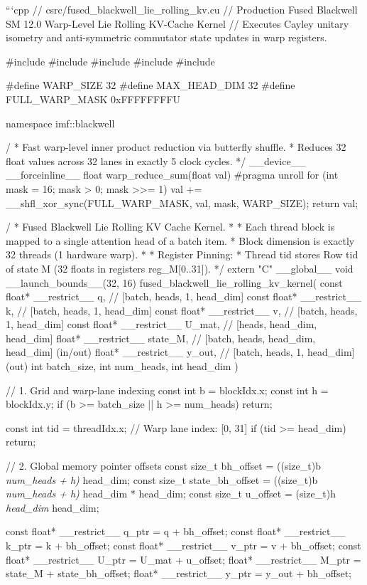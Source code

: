 \documentclass[11pt,twoside,openright]{amsbook}
\begin{document}
{{{{{{{```cpp
// csrc/fused_blackwell_lie_rolling_kv.cu
// Production Fused Blackwell SM 12.0 Warp-Level Lie Rolling KV-Cache Kernel
// Executes Cayley unitary isometry and anti-symmetric commutator state updates in warp registers.

#include 
#include 
#include 
#include 
#include 

#define WARP_SIZE 32
#define MAX_HEAD_DIM 32
#define FULL_WARP_MASK 0xFFFFFFFFU

namespace imf::blackwell {

/\textit{}
 * Fast warp-level inner product reduction via butterfly shuffle.
 * Reduces 32 float values across 32 lanes in exactly 5 clock cycles.
 */
__device__ __forceinline__ float warp_reduce_sum(float val) {
    #pragma unroll
    for (int mask = 16; mask > 0; mask >>= 1) {
        val += __shfl_xor_sync(FULL_WARP_MASK, val, mask, WARP_SIZE);
    }
    return val;
}

/\textit{}
 * Fused Blackwell Lie Rolling KV Cache Kernel.
 *
 * Each thread block is mapped to a single attention head of a batch item.
 * Block dimension is exactly 32 threads (1 hardware warp).
 *
 * Register Pinning:
 * Thread tid stores Row tid of state M (32 floats in registers reg_M[0..31]).
 */
extern "C" __global__ void __launch_bounds__(32, 16) fused_blackwell_lie_rolling_kv_kernel(
    const float* __restrict__ q,          // [batch, heads, 1, head_dim]
    const float* __restrict__ k,          // [batch, heads, 1, head_dim]
    const float* __restrict__ v,          // [batch, heads, 1, head_dim]
    const float* __restrict__ U_mat,      // [heads, head_dim, head_dim]
    float* __restrict__ state_M,          // [batch, heads, head_dim, head_dim] (in/out)
    float* __restrict__ y_out,            // [batch, heads, 1, head_dim] (out)
    int batch_size,
    int num_heads,
    int head_dim
) {
    // 1. Grid and warp-lane indexing
    const int b = blockIdx.x;
    const int h = blockIdx.y;
    if (b >= batch_size || h >= num_heads) return;

    const int tid = threadIdx.x; // Warp lane index: [0, 31]
    if (tid >= head_dim) return;

    // 2. Global memory pointer offsets
    const size_t bh_offset = ((size_t)b \textit{ num_heads + h) } head_dim;
    const size_t state_bh_offset = ((size_t)b \textit{ num_heads + h) } head_dim * head_dim;
    const size_t u_offset = (size_t)h \textit{ head_dim } head_dim;

    const float* __restrict__ q_ptr = q + bh_offset;
    const float* __restrict__ k_ptr = k + bh_offset;
    const float* __restrict__ v_ptr = v + bh_offset;
    const float* __restrict__ U_ptr = U_mat + u_offset;
    float* __restrict__ M_ptr = state_M + state_bh_offset;
    float* __restrict__ y_ptr = y_out + bh_offset;

}}}}}}}}}
\end{document}

